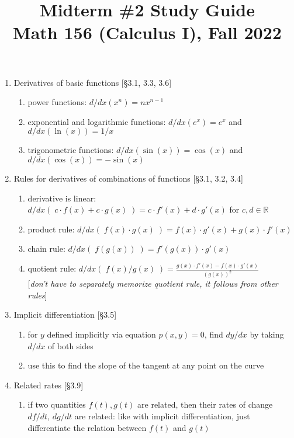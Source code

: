 \documentclass[11pt]{article}
\title{Midterm \#2 Study Guide \\ Math 156 (Calculus I), Fall 2022}
\date{}
\begin{document}
\maketitle

\thispagestyle{empty}

\vspace{-1.75cm}

\begin{enumerate}
\item Derivatives of basic functions [\S 3.1, 3.3, 3.6]
\begin{enumerate}
\item power functions: $d/dx (x^n) = n x^{n-1}$
\item exponential and logarithmic functions: $d/dx(e^x) = e^x$ and $d/dx(\ln(x)) = 1/x$
\item trigonometric functions: $d/dx(\sin(x)) = \cos(x)$ and $d/dx(\cos(x)) = -\sin(x)$
\end{enumerate}

\item Rules for derivatives of combinations of functions [\S 3.1, 3.2, 3.4]
\begin{enumerate}
\item derivative is linear: $d/dx( \; c\cdot f(x) + c\cdot g(x) \;) = c \cdot f'(x) + d \cdot g'(x)$ for $c,d \in \mathbb{R}$
\item product rule: $d/dx( \; f(x)\cdot g(x) \;) = f(x) \cdot g'(x) + g(x) \cdot f'(x)$
\item chain rule: $d/dx (\; f(g(x)) \; ) = f'(g(x)) \cdot g'(x)$
\item quotient rule: $\displaystyle d/dx (\; f(x)/g(x) \;) = \frac{g(x)\cdot f'(x) - f(x)\cdot g'(x)}{(g(x))^2}$\\ {[\emph{don't have to separately memorize quotient rule, it follows from other rules}]}
\end{enumerate}

\item Implicit differentiation [\S 3.5]
\begin{enumerate}
\item for $y$ defined implicitly via equation $p(x,y)=0$, find $dy/dx$ by taking $d/dx$ of both sides
\item use this to find the slope of the tangent at any point on the curve
\end{enumerate}

\item Related rates [\S 3.9]
\begin{enumerate}
\item if two quantities $f(t), g(t)$ are related, then their rates of change $df/dt$, $dg/dt$ are related: like with implicit differentiation, just differentiate the relation between $f(t)$ and $g(t)$
\end{enumerate}


\end{enumerate}
\end{document}
